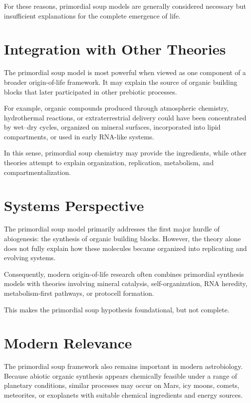 \documentclass[
  oneside]{book}
\begin{document}
For these reasons, primordial soup models are generally considered necessary but insufficient explanations for the complete emergence of life.

\section{Integration with Other Theories}\label{integration-with-other-theories}

The primordial soup model is most powerful when viewed as one component of a broader origin-of-life framework. It may explain the source of organic building blocks that later participated in other prebiotic processes.

For example, organic compounds produced through atmospheric chemistry, hydrothermal reactions, or extraterrestrial delivery could have been concentrated by wet--dry cycles, organized on mineral surfaces, incorporated into lipid compartments, or used in early RNA-like systems.

In this sense, primordial soup chemistry may provide the ingredients, while other theories attempt to explain organization, replication, metabolism, and compartmentalization.

\section{Systems Perspective}\label{systems-perspective}

The primordial soup model primarily addresses the first major hurdle of abiogenesis: the synthesis of organic building blocks. However, the theory alone does not fully explain how these molecules became organized into replicating and evolving systems.

Consequently, modern origin-of-life research often combines primordial synthesis models with theories involving mineral catalysis, self-organization, RNA heredity, metabolism-first pathways, or protocell formation.

This makes the primordial soup hypothesis foundational, but not complete.

\section{Modern Relevance}\label{modern-relevance}

The primordial soup framework also remains important in modern astrobiology. Because abiotic organic synthesis appears chemically feasible under a range of planetary conditions, similar processes may occur on Mars, icy moons, comets, meteorites, or exoplanets with suitable chemical ingredients and energy sources.
\end{document}
